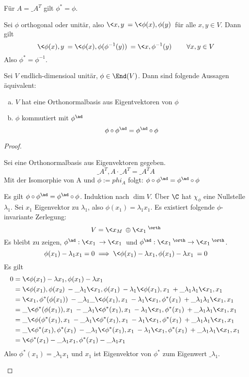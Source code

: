 \documentclass{mycourse}
\begin{document}
\begin{ex}
	Für $A=\_A^T$ gilt $\phi^* = \phi$.

	Sei $\phi$ orthogonal oder unitär, also $\<x,y\> = \<\phi(x),\phi(y)\>$ für alle $x,y\in V$.
	Dann gilt
	\[
		\<\phi(x),y\> = \<\phi(x),\phi(\phi^{-1}(y))\> = \<x, \phi^{-1}(y)\> \qquad \forall x,y\in V
	\]
	Also $\phi^* = \phi^{-1}$.
\end{ex}

\begin{thm}
	\label{thm:13.25}
	Sei $V$ endlich-dimensioal unitär, $\phi\in \End(V)$.
	Dann sind folgende Aussagen äquivalent:
	\begin{enumerate}[(a)]
		\item
			$V$ hat eine Orthonormalbasis aus Eigentvektoren von $\phi$
		\item
			$\phi$ kommutiert mit $\phi^{\ad}$
			\[
				\phi \circ \phi^{\ad} = \phi^{\ad} \circ \phi
			\]
	\end{enumerate}
	\begin{proof}
		\begin{seg}[„$(a)\implies (b)$“]
			Sei eine Orthonormalbasis aus Eigenvektoren gegeben.
			\[
				\_A^T, A\cdot \_A^T = \_A^T A
			\]
			Mit der Isomorphie von A und $\phi:=phi_A$ folgt: $\phi\circ \phi^{\ad} = \phi^{\ad}\circ \phi$
		\end{seg}
		\begin{seg}[„$(b)\implies (a)$“]
			Es gilt $\phi \circ \phi^{\ad} = \phi^{\ad}\circ \phi$.
			Induktion nach $\dim V$.
			Über $\C$ hat $\chi_\phi$ eine Nullstelle $\lambda_1$.
			Sei $x_1$ Eigenvektor zu $\lambda_1$, also $\phi(x_1) = \lambda_1 x_1$.
			Es existiert folgende $\phi$-invariante Zerlegung:
			\[
				V = \<x_M\>  \oplus \<x_1\>^\orth
			\]
			Es bleibt zu zeigen, $\phi^{\ad}: \<x_1\> \to \<x_1\>$ und $\phi^{\ad}: \<x_1\>^\orth \to \<x_1\>^\orth$.
			\[
				\phi(x_1) -\lambda_1 x_1 = 0 \implies \<\phi(x_1)-\lambda x_1, \phi(x_1) - \lambda x_1\> = 0
			\]
			Es gilt
			\begin{align*}
				0 &= \<\phi(x_1)-\lambda x_1, \phi(x_1) - \lambda x_1\> \\
				  &= \<\phi(x_1),\phi(x_2)\> - \_\lambda_1 \<x_1,\phi(x_1)\> - \lambda_1 \<\phi(x_1), x_1\> + \_\lambda_1\lambda_1\<x_1,x_1\>\\
				  &= \<x_1,\phi^*(\phi(x_1))\> - \_\lambda_1\_{\<\phi(x_1),x_1\>} - \lambda_1\<x_1,\phi^*(x_1)\> + \_\lambda_1\lambda_1 \<x_1,x_1\>\\
				  &= \_{\<\phi^*(\phi(x_1)),x_1\>} - \_\lambda_1 \<\phi^*(x_1),x_1\> - \lambda_1\<x_1,\phi^*(x_1)\> + \_\lambda_1\lambda_1 \<x_1,x_1\>\\
				  &= \_{\<\phi(\phi^*(x_1),x_1\>} - \_\lambda_1\<\phi^*(x_1),x_1\> - \lambda_1\<x_1,\phi^*(x_1)\> + \_\lambda_1\lambda_1\<x_1,x_1\>\\
				  &= \_{\<\phi^*(x_1),\phi^*(x_1)\>} - \_\lambda_1 \<\phi^*(x_1),x_1\> - \lambda_1 \<x_1,\phi^*(x_1)\> + \_\lambda_1\lambda_1 \<x_1,x_1\>\\
				  &= \<\phi^*(x_1)-\_\lambda_1x_1, \phi^*(x_1)-\_\lambda_1x_1\>
			\end{align*}
			Also $\phi^*(x_1) = \_\lambda_1 x_1$ und $x_1$ ist Eigenvektor von $\phi^*$ zum Eigenwert $\_\lambda_1$.


\end{seg}
\end{proof}
\end{thm}
\end{document}
